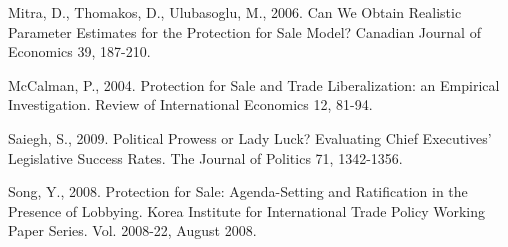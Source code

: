 \documentclass[10pt]{article}
\begin{document}
\begin{list}{}{\setlength{\leftmargin}{0.0in}\setlength{\rightmargin}{0.0in}\setlength{\itemindent}{0.0in}\setlength{\itemsep}{0.1in}}
\item Mitra, D., Thomakos, D., Ulubasoglu, M., 2006. Can We Obtain Realistic Parameter Estimates for the Protection for Sale Model? Canadian Journal of Economics 39, 187-210.


\item McCalman, P., 2004. Protection for Sale and Trade Liberalization: an Empirical Investigation. Review of International Economics 12, 81-94.


\item Saiegh, S., 2009. Political  Prowess or Lady Luck? Evaluating Chief Executives' Legislative Success Rates. The Journal of Politics 71, 1342-1356.

\item Song, Y., 2008. Protection for Sale: Agenda-Setting and Ratification in the Presence of Lobbying. Korea Institute for International Trade Policy Working Paper Series. Vol. 2008-22, August 2008.



\end{list}
\end{document}
